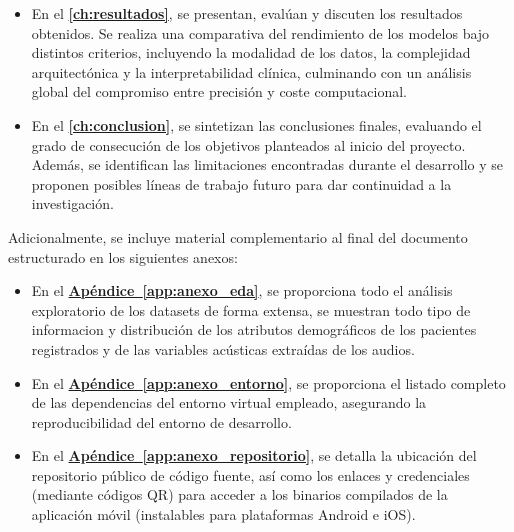 \begin{itemize}
    \item En el \textbf{\autoref{ch:resultados}}, se presentan, evalúan y discuten los resultados obtenidos. Se realiza una comparativa del rendimiento de los modelos bajo distintos criterios, incluyendo la modalidad de los datos, la complejidad arquitectónica y la interpretabilidad clínica, culminando con un análisis global del compromiso entre precisión y coste computacional.
    
    \item En el \textbf{\autoref{ch:conclusion}}, se sintetizan las conclusiones finales, evaluando el grado de consecución de los objetivos planteados al inicio del proyecto. Además, se identifican las limitaciones encontradas durante el desarrollo y se proponen posibles líneas de trabajo futuro para dar continuidad a la investigación.
    
\end{itemize} 

Adicionalmente, se incluye material complementario al final del documento estructurado en los siguientes anexos:

\begin{itemize}
    \item En el \textbf{\hyperref[app:anexo_eda]{Apéndice~\ref*{app:anexo_eda}}}, se proporciona todo el análisis exploratorio de los datasets de forma extensa, se muestran todo tipo de informacion y distribución de los atributos demográficos de los pacientes registrados y de las variables acústicas extraídas de los audios.
    \item En el \textbf{\hyperref[app:anexo_entorno]{Apéndice~\ref*{app:anexo_entorno}}}, se proporciona el listado completo de las dependencias del entorno virtual empleado, asegurando la reproducibilidad del entorno de desarrollo.
    \item En el \textbf{\hyperref[app:anexo_repositorio]{Apéndice~\ref*{app:anexo_repositorio}}}, se detalla la ubicación del repositorio público de código fuente, así como los enlaces y credenciales (mediante códigos QR) para acceder a los binarios compilados de la aplicación móvil (instalables para plataformas Android e iOS).
\end{itemize}